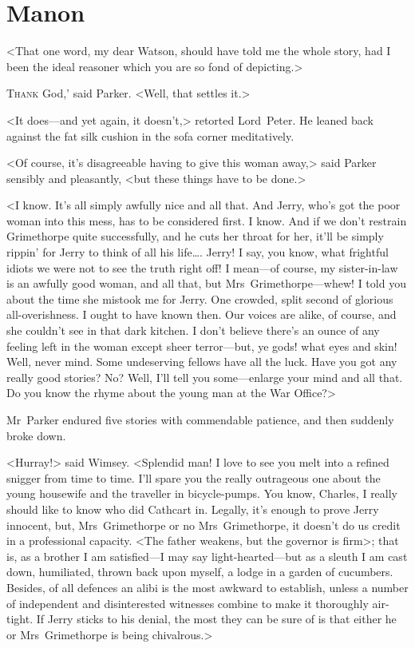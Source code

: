 
\chapter{Manon}
\epigraph{<That one word, my dear Watson, should have told me the whole story, had I been the ideal reasoner which you are so fond of depicting.>}{}


\lettrine[ante=`]{T}{hank} God,' said Parker. <Well, that settles it.>

\zz
<It does—and yet again, it doesn't,> retorted Lord~Peter. He leaned back against the fat silk cushion in the sofa corner meditatively.

<Of course, it's disagreeable having to give this woman away,> said Parker sensibly and pleasantly, <but these things have to be done.>

<I know. It's all simply awfully nice and all that. And Jerry, who's got the poor woman into this mess, has to be considered first. I know. And if we don't restrain Grimethorpe quite successfully, and he cuts her throat for her, it'll be simply rippin' for Jerry to think of all his life\dots . Jerry! I say, you know, what frightful idiots we were not to see the truth right off! I mean—of course, my sister-in-law is an awfully good woman, and all that, but Mrs~Grimethorpe—whew! I told you about the time she mistook me for Jerry. One crowded, split second of glorious all-overishness. I ought to have known then. Our voices are alike, of course, and she couldn't see in that dark kitchen. I don't believe there's an ounce of any feeling left in the woman except sheer terror—but, ye gods! what eyes and skin! Well, never mind. Some undeserving fellows have all the luck. Have you got any really good stories? No? Well, I'll tell you some—enlarge your mind and all that. Do you know the rhyme about the young man at the War Office?>

Mr~Parker endured five stories with commendable patience, and then suddenly broke down.

<Hurray!> said Wimsey. <Splendid man! I love to see you melt into a refined snigger from time to time. I'll spare you the really outrageous one about the young housewife and the traveller in bicycle-pumps. You know, Charles, I really should like to know who did Cathcart in. Legally, it's enough to prove Jerry innocent, but, Mrs~Grimethorpe or no Mrs~Grimethorpe, it doesn't do us credit in a professional capacity. <The father weakens, but the governor is firm>; that is, as a brother I am satisfied—I may say light-hearted—but as a sleuth I am cast down, humiliated, thrown back upon myself, a lodge in a garden of cucumbers. Besides, of all defences an alibi is the most awkward to establish, unless a number of independent and disinterested witnesses combine to make it thoroughly air-tight. If Jerry sticks to his denial, the most they can be sure of is that either he or Mrs~Grimethorpe is being chivalrous.>

